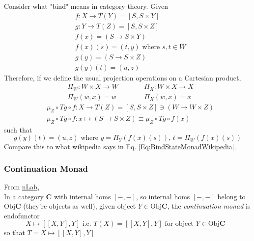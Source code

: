 \documentclass[10pt]{amsart}
\begin{document}
\begin{multicols*}{2}
Consider what "bind" means in category theory. Given
\begin{equation}
\begin{aligned}
& f:X \to T(Y) = [S, S \times Y] \\ 
& g: Y \to T(Z) = [S, S\times Z] \\ 
& f(x) = (S \to S\times Y) \\
& f(x)(s) = (t, y) \text{ where } s, t \in W \\ 
& g(y) = (S \to S \times Z) \\ 
& g(y)(t) = (u, z)
\end{aligned}
\end{equation}
Therefore, if we define the usual projection operations on a Cartesian product,
\begin{equation}
\begin{aligned}
& \Pi_W : W \times X \to W \\
& \Pi_W(w,x) = w
\end{aligned} \qquad \, 
\begin{aligned}
& \Pi_X : W \times X \to X \\
& \Pi_X(w,x) = x
\end{aligned}
\end{equation}
\begin{equation}
\begin{aligned}
& \mu_Z \circ Tg \circ f : X \to T(Z) = [S, S\times Z] \ni (W \to W \times Z) \\ 
& \mu_Z \circ Tg \circ f : x \mapsto (S \to S \times Z) \equiv \mu_Z \circ Tg \circ f(x)
\end{aligned}
\end{equation}
such that 
\begin{equation}
\boxed{ g(y)(t) = (u,z) \text{ where } y = \Pi_Y(f(x)(s)), \, t = \Pi_W(f(x)(s)) }
\end{equation}
Compare this to what wikipedia says in Eq. \ref{Eq:BindStateMonadWikipedia}.

\subsubsection{Continuation Monad}

From \href{https://ncatlab.org/nlab/show/continuation+monad}{nLab}, \\
In a category $\mathbf{C}$ with internal homs $[-, -]$, so internal homs $[-,-]$ belong to $\text{Obj}{\mathbf{C}}$ (they're objects as well), given object $Y \in \text{Obj}{\mathbf{C}}$, the \emph{continuation monad} is endofunctor
\begin{equation}
\boxed{ X \mapsto [[X, Y], Y] } \text{ i.e. } T(X) = [[X, Y], Y] \text{ for object $Y \in \text{Obj}{\mathbf{C}}$ } 
\end{equation}
so that $T = X\mapsto [[X, Y] , Y]$


\end{multicols*}
\end{document}
